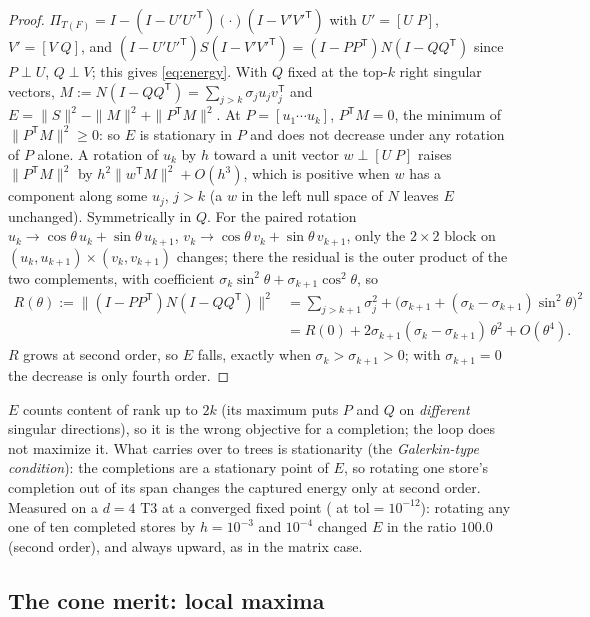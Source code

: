 \documentclass[11pt]{article}
\newcommand{\T}{\mathsf{T}}
\theoremstyle{definition}
\theoremstyle{plain}
\begin{document}
\begin{proof}
$\Pi_{T(F)}=I-(I-U'U'^\T)(\cdot)(I-V'V'^\T)$ with $U'=[U\;P]$, $V'=[V\;Q]$, and
$(I-U'U'^\T)S(I-V'V'^\T)=(I-PP^\T)N(I-QQ^\T)$ since $P\perp U$, $Q\perp V$; this gives \eqref{eq:energy}. With $Q$
fixed at the top-$k$ right singular vectors, $M:=N(I-QQ^\T)=\sum_{j>k}\sigma_ju_jv_j^\T$ and
$E=\|S\|^2-\|M\|^2+\|P^\T M\|^2$. At $P=[u_1\cdots u_k]$, $P^\T M=0$, the minimum of $\|P^\T M\|^2\ge 0$: so $E$ is
stationary in $P$ and does not decrease under any rotation of $P$ alone. A rotation of $u_k$ by $h$ toward a unit
vector $w\perp[U\;P]$ raises $\|P^\T M\|^2$ by $h^2\|w^\T M\|^2+O(h^3)$, which is positive when $w$ has a component
along some $u_j$, $j>k$ (a $w$ in the left null space of $N$ leaves $E$ unchanged). Symmetrically in $Q$. For the
paired rotation $u_k\to\cos\theta\,u_k+\sin\theta\,u_{k+1}$, $v_k\to\cos\theta\,v_k+\sin\theta\,v_{k+1}$, only the
$2\times2$ block on $(u_k,u_{k+1})\times(v_k,v_{k+1})$ changes; there the residual is the outer product of the two
complements, with coefficient $\sigma_k\sin^2\theta+\sigma_{k+1}\cos^2\theta$, so
\begin{align*}
  R(\theta):=\bigl\|(I-PP^\T)N(I-QQ^\T)\bigr\|^2
  &=\sum_{j>k+1}\sigma_j^2+\bigl(\sigma_{k+1}+(\sigma_k-\sigma_{k+1})\sin^2\theta\bigr)^2\\
  &= R(0)+2\sigma_{k+1}(\sigma_k-\sigma_{k+1})\,\theta^2+O(\theta^4).
\end{align*}
$R$ grows at second order, so $E$ falls, exactly when $\sigma_k>\sigma_{k+1}>0$; with $\sigma_{k+1}=0$ the decrease is
only fourth order.
\end{proof}

$E$ counts content of rank up to $2k$ (its maximum puts $P$ and $Q$ on \emph{different} singular directions), so it
is the wrong objective for a completion; the loop does not maximize it. What carries over to trees is stationarity
(the \emph{Galerkin-type condition}): the completions are a stationary point of $E$, so rotating one store's
completion out of its span changes the captured energy only at second order. Measured on a $d=4$ T3 at a converged
fixed point ( at $\mathrm{tol}=10^{-12}$): rotating any one of ten completed stores by
$h=10^{-3}$ and $10^{-4}$ changed $E$ in the ratio $100.0$ (second order), and always upward, as in the matrix case.

\subsection{The cone merit: local maxima}
\end{document}
